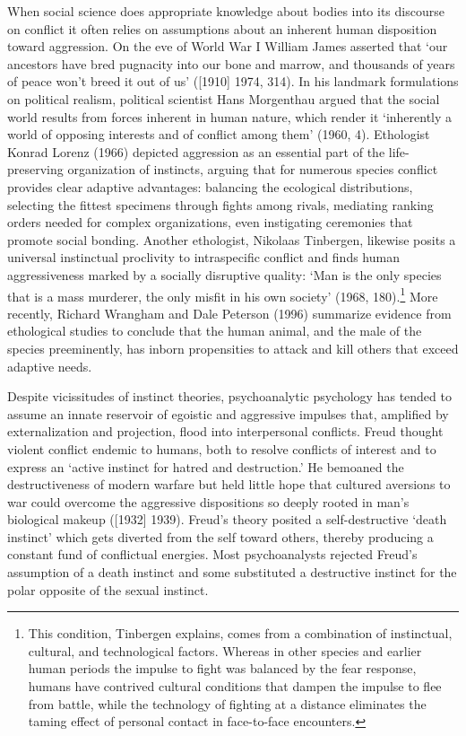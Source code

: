 When social science does appropriate knowledge about bodies into its discourse on conflict it often relies on assumptions about an inherent human disposition toward aggression. On the eve of World War I William James asserted that `our ancestors have bred pugnacity into our bone and marrow, and thousands of years of peace won't breed it out of us' ([1910] 1974, 314). In his landmark formulations on political realism, political scientist Hans Morgenthau argued that the social world results from forces inherent in human nature, which render it `inherently a world of opposing interests and of conflict among them' (1960, 4). Ethologist Konrad Lorenz (1966) depicted aggression as an essential part of the life-preserving organization of instincts, arguing that for numerous species conflict provides clear adaptive advantages: balancing the ecological distributions, selecting the fittest specimens through fights among rivals, mediating ranking orders needed for complex organizations, even instigating ceremonies that promote social bonding. Another ethologist, Nikolaas Tinbergen, likewise posits a universal instinctual proclivity to intraspecific conflict and finds human aggressiveness marked by a socially disruptive quality: `Man is the only species that is a mass murderer, the only misfit in his own society' (1968, 180).\footnote{This condition, Tinbergen explains, comes from a combination of instinctual, cultural, and technological factors. Whereas in other species and earlier human periods the impulse to fight was balanced by the fear response, humans have contrived cultural conditions that dampen the impulse to flee from battle, while the technology of fighting at a distance eliminates the taming effect of personal contact in face-to-face encounters.} More recently, Richard Wrangham and Dale Peterson (1996) summarize evidence from ethological studies to conclude that the human animal, and the male of the species preeminently, has inborn propensities to attack and kill others that exceed adaptive needs.

Despite vicissitudes of instinct theories, psychoanalytic psychology has tended to assume an innate reservoir of egoistic and aggressive impulses that, amplified by externalization and projection, flood into interpersonal conflicts. Freud thought violent conflict endemic to humans, both to resolve conflicts of interest and to express an `active instinct for hatred and destruction.' He bemoaned the destructiveness of modern warfare but held little hope that cultured aversions to war could overcome the aggressive dispositions so deeply rooted in man's biological makeup ([1932] 1939). Freud's theory posited a self-destructive `death instinct' which gets diverted from the self toward others, thereby producing a constant fund of conflictual energies. Most psychoanalysts rejected Freud's assumption of a death instinct and some substituted a destructive instinct for the polar opposite of the sexual instinct.

